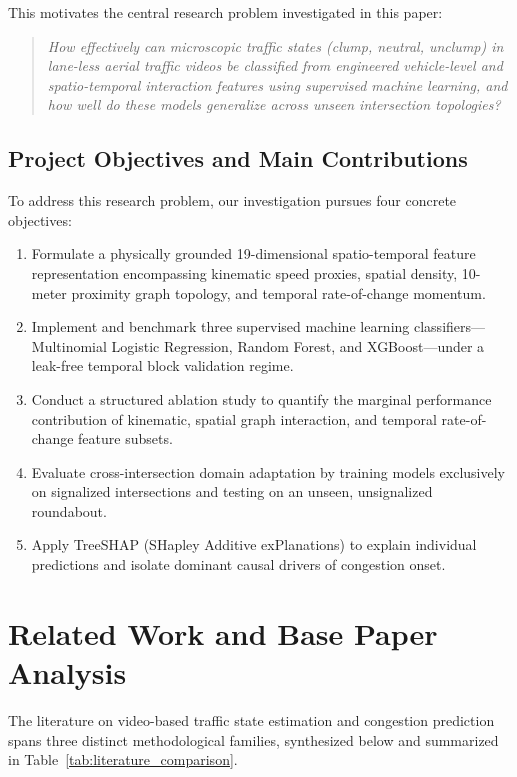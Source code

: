 \documentclass[conference]{IEEEtran}
\begin{document}
This motivates the central research problem investigated in this paper:
\begin{quote}
\textit{How effectively can microscopic traffic states (\textit{clump}, \textit{neutral}, \textit{unclump}) in lane-less aerial traffic videos be classified from engineered vehicle-level and spatio-temporal interaction features using supervised machine learning, and how well do these models generalize across unseen intersection topologies?}
\end{quote}

\subsection{Project Objectives and Main Contributions}
To address this research problem, our investigation pursues four concrete objectives:
\begin{enumerate}
    \item Formulate a physically grounded 19-dimensional spatio-temporal feature representation encompassing kinematic speed proxies, spatial density, 10-meter proximity graph topology, and temporal rate-of-change momentum.
    \item Implement and benchmark three supervised machine learning classifiers---Multinomial Logistic Regression, Random Forest, and XGBoost---under a leak-free temporal block validation regime.
    \item Conduct a structured ablation study to quantify the marginal performance contribution of kinematic, spatial graph interaction, and temporal rate-of-change feature subsets.
    \item Evaluate cross-intersection domain adaptation by training models exclusively on signalized intersections and testing on an unseen, unsignalized roundabout.
    \item Apply TreeSHAP (SHapley Additive exPlanations) to explain individual predictions and isolate dominant causal drivers of congestion onset.
\end{enumerate}

\section{Related Work and Base Paper Analysis}

The literature on video-based traffic state estimation and congestion prediction spans three distinct methodological families, synthesized below and summarized in Table~\ref{tab:literature_comparison}.
\end{document}
